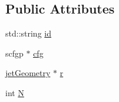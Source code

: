 \subsection*{Public Attributes}
\begin{DoxyCompactItemize}
\item 
std\-::string \hyperlink{classbaseClass_a4d5ff386a69bcbe21b5976f55b624df6}{id}
\item 
scfgp $\ast$ \hyperlink{classbaseClass_a744f87a6ebe63da08256c022d42a4ca7}{cfg}
\item 
\hyperlink{classjetGeometry}{jet\-Geometry} $\ast$ \hyperlink{classbaseClass_a482bb9b1d94f3eb3f31026d14e9a2bb6}{r}
\item 
int \hyperlink{classbaseClass_a2b4d07d2b46197d495de0477f4bb22f8}{N}
\end{DoxyCompactItemize}


